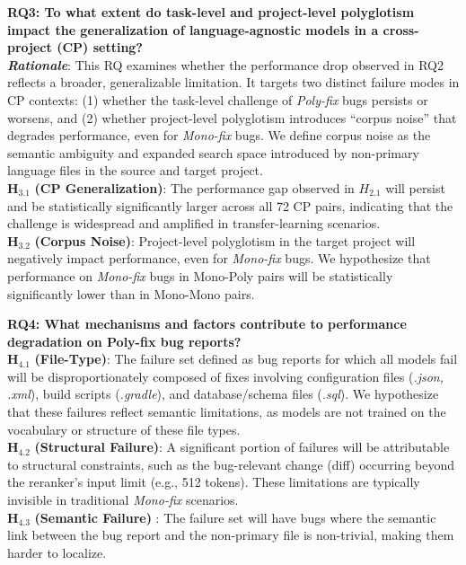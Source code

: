 \documentclass[12pt,table,xcdraw]{article}
\begin{document}
\textbf{RQ3: To what extent do task-level and project-level polyglotism impact the generalization of language-agnostic models in a cross-project (CP) setting?} \\
\textit{\textbf{Rationale}}: This RQ examines whether the performance drop observed in RQ2 reflects a broader, generalizable limitation. It targets two distinct failure modes in CP contexts: (1) whether the task-level challenge of \textit{Poly-fix} bugs persists or worsens, and (2) whether project-level polyglotism introduces ``corpus noise'' that degrades performance, even for \textit{Mono-fix} bugs. We define corpus noise as the semantic ambiguity and expanded search space introduced by non-primary language files in the source and target project.\\
$\boldsymbol{H_{3.1}}$ \textbf{(CP Generalization)}: The performance gap observed in $H_{2.1}$ will persist and be statistically significantly larger across all 72 CP pairs, indicating that the challenge is widespread and amplified in transfer-learning scenarios.\\
$\boldsymbol{H_{3.2}}$ \textbf{(Corpus Noise)}: Project-level polyglotism in the target project will negatively impact performance, even for \textit{Mono-fix} bugs. We hypothesize that performance on \textit{Mono-fix }bugs in Mono-Poly pairs will be statistically significantly lower than in Mono-Mono pairs.

\textbf{RQ4: What mechanisms and factors contribute to performance degradation on Poly-fix bug reports?} \\
$\boldsymbol{H_{4.1}}$ \textbf{(File-Type)}: The failure set defined as bug reports for which all models fail will be disproportionately composed of fixes involving configuration files (\textit{.json, .xml}), build scripts (\textit{.gradle}), and database/schema files (\textit{.sql}). We hypothesize that these failures reflect semantic limitations, as models are not trained on the vocabulary or structure of these file types. \\
$\boldsymbol{H_{4.2}}$ \textbf{(Structural Failure)}: A significant portion of failures will be attributable to structural constraints, such as the bug-relevant change (diff) occurring beyond the reranker's input limit (e.g., 512 tokens). These limitations are typically invisible in traditional \textit{Mono-fix} scenarios.\\
$\boldsymbol{H_{4.3}}$ \textbf{(Semantic Failure)} : The failure set will have bugs where the semantic link between the bug report and the non-primary file is non-trivial, making them harder to localize.
\end{document}
